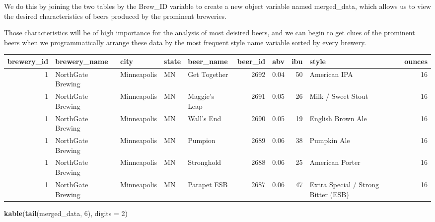 \documentclass[]{article}
\newenvironment{Shaded}{\begin{snugshade}}{\end{snugshade}}
\newcommand{\KeywordTok}[1]{\textcolor[rgb]{0.13,0.29,0.53}{\textbf{#1}}}
\newcommand{\DataTypeTok}[1]{\textcolor[rgb]{0.13,0.29,0.53}{#1}}
\newcommand{\DecValTok}[1]{\textcolor[rgb]{0.00,0.00,0.81}{#1}}
\newcommand{\StringTok}[1]{\textcolor[rgb]{0.31,0.60,0.02}{#1}}
\newcommand{\CommentTok}[1]{\textcolor[rgb]{0.56,0.35,0.01}{\textit{#1}}}
\newcommand{\OperatorTok}[1]{\textcolor[rgb]{0.81,0.36,0.00}{\textbf{#1}}}
\newcommand{\NormalTok}[1]{#1}
\begin{document}
We do this by joining the two tables by the Brew\_ID variable to create
a new object variable named merged\_data, which allows us to view the
desired characteristics of beers produced by the prominent breweries.

Those characteristics will be of high importance for the analysis of
most deisired beers, and we can begin to get clues of the prominent
beers when we programmatically arrange these data by the most frequent
style name variable sorted by every brewery.

\begin{Shaded}
\end{Shaded}

\begin{longtable}[]{@{}rllllrrrlr@{}}
\toprule
brewery\_id & brewery\_name & city & state & beer\_name & beer\_id & abv
& ibu & style & ounces\tabularnewline
\midrule
\endhead
1 & NorthGate Brewing & Minneapolis & MN & Get Together & 2692 & 0.04 &
50 & American IPA & 16\tabularnewline
1 & NorthGate Brewing & Minneapolis & MN & Maggie's Leap & 2691 & 0.05 &
26 & Milk / Sweet Stout & 16\tabularnewline
1 & NorthGate Brewing & Minneapolis & MN & Wall's End & 2690 & 0.05 & 19
& English Brown Ale & 16\tabularnewline
1 & NorthGate Brewing & Minneapolis & MN & Pumpion & 2689 & 0.06 & 38 &
Pumpkin Ale & 16\tabularnewline
1 & NorthGate Brewing & Minneapolis & MN & Stronghold & 2688 & 0.06 & 25
& American Porter & 16\tabularnewline
1 & NorthGate Brewing & Minneapolis & MN & Parapet ESB & 2687 & 0.06 &
47 & Extra Special / Strong Bitter (ESB) & 16\tabularnewline
\bottomrule
\end{longtable}

\begin{Shaded}
\begin{Highlighting}[]
\KeywordTok{kable}\NormalTok{(}\KeywordTok{tail}\NormalTok{(merged_data, }\DecValTok{6}\NormalTok{), }\DataTypeTok{digits =} \DecValTok{2}\NormalTok{)}
\end{Highlighting}
\end{Shaded}
\end{document}
